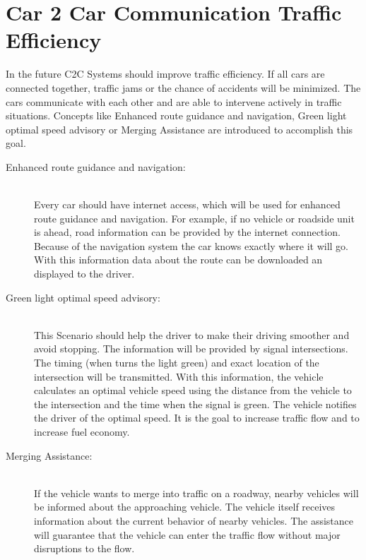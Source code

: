 \section{Car 2 Car Communication Traffic Efficiency}
\label{sec:C2CTarfficEfficiency}
In the future C2C Systems should improve traffic efficiency. If all cars are connected together, traffic jams or the chance of accidents will be minimized. The cars communicate with each other and are able to intervene actively in traffic situations. Concepts like Enhanced route guidance and navigation, Green light optimal speed advisory or Merging Assistance are introduced to accomplish this goal.\\
\begin{description}
  \item[Enhanced route guidance and navigation:] \hfill \\ Every car should have internet access, which will be used for enhanced route guidance and navigation. For example, if no vehicle or roadside unit is ahead, road information can be provided by the internet connection. Because of the navigation system the car knows exactly where it will go. With this information data about the route can be downloaded an displayed to the driver. 
  \item[Green light optimal speed advisory:] \hfill \\ This Scenario should help the driver to make their driving smoother and avoid stopping. The information will be provided by signal intersections. The timing (when turns the light green) and exact location of the intersection will be transmitted. With this information, the vehicle calculates an optimal vehicle speed using the distance from the vehicle to the intersection and the time when the signal is green. The vehicle notifies the driver of the optimal speed. It is the goal to increase traffic flow and to increase fuel economy. 
  \item[Merging Assistance:] \hfill \\ If the vehicle wants to merge into traffic on a roadway, nearby vehicles will be informed about the approaching vehicle. The vehicle itself receives information about the current behavior of nearby vehicles. The assistance will guarantee that the vehicle can enter the traffic flow without major disruptions to the flow. 
\end{description}	

